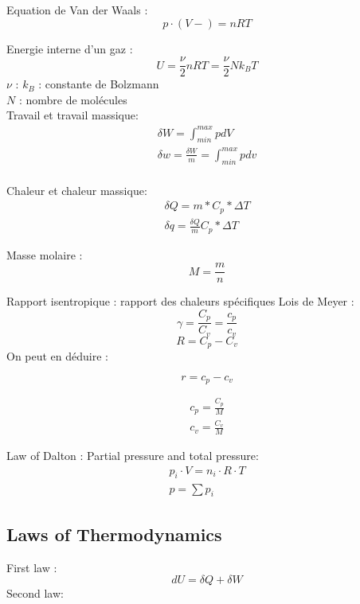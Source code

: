 	
	Equation de Van der Waals :
	\begin{equation}
	p \cdot (V-)=n R T
	\end{equation}
	
	Energie interne d'un gaz :
	\begin{equation}
	U=\frac{\nu}{2} nRT=\frac{\nu}{2} N k_B T
	\end{equation}
	$\nu$ : 
	$k_B$ : constante de Bolzmann\\
	$N$ :  nombre de molécules\\
	
	Travail et travail massique:
	\begin{eqnarray}
	\delta W=\int_{min}^{max} p dV\\
	\delta w=\frac{\delta W}{m} =\int_{min}^{max} p dv\\
	\end{eqnarray}
	
	Chaleur et chaleur massique: 
	\begin{eqnarray}
	\delta Q=m*C_p*\Delta T\\
	\delta q= \frac{\delta Q}{m} C_p* \Delta T
	\end{eqnarray}
	
	Masse molaire :
	\begin{equation}
	M=\frac{m}{n}
	\end{equation}
	
	Rapport isentropique : rapport des chaleurs spécifiques
	Lois de Meyer :
	\begin{equation}
	\gamma=\frac{C_p}{C_v}=\frac{c_p}{c_v}
	\end{equation}
	\begin{equation}
	R=C_p-C_v
	\end{equation}
	On peut en déduire :
	
	\begin{equation}
	r=c_p-c_v
	\end{equation}
	
	\begin{eqnarray}
	c_p=\frac{C_p}{M}\\
	c_v=\frac{C_v}{M}
	\end{eqnarray}
	
	Law of Dalton : Partial pressure and total pressure:
	\begin{eqnarray}
	p_i \cdot V=n_i \cdot R \cdot T\\
	p=\sum p_i
	\end{eqnarray}
	
	\subsection{Laws of Thermodynamics}
	First law : 
	\begin{equation}
	dU=\delta Q + \delta W
	\end{equation}
	Second law:
	
